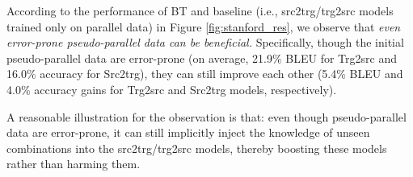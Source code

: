 \documentclass[letterpaper]{article} %
\begin{document}

According to the performance of BT and baseline (i.e., src2trg/trg2src models trained only on parallel data) in Figure \ref{fig:stanford_res}, we observe that \emph{even error-prone pseudo-parallel data can be beneficial.}
Specifically, though the initial pseudo-parallel data are error-prone (on average, 21.9\% BLEU for Trg2src and 16.0\% accuracy for Src2trg), they can still improve each other (5.4\% BLEU and 4.0\% accuracy gains for Trg2src and Src2trg models, respectively).

A reasonable illustration for the observation is that: even though pseudo-parallel data are error-prone, it can still implicitly inject the knowledge of unseen combinations into the src2trg/trg2src models, thereby boosting these models rather than harming them.
\end{document}
